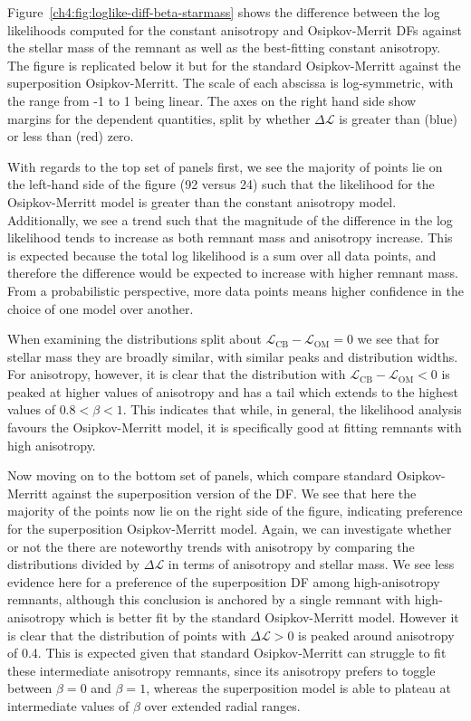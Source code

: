 Figure~\ref{ch4:fig:loglike-diff-beta-starmass} shows the difference between the log likelihoods computed for the constant anisotropy and Osipkov-Merrit DFs against the stellar mass of the remnant as well as the best-fitting constant anisotropy. The figure is replicated below it but for the standard Osipkov-Merritt against the superposition Osipkov-Merritt. The scale of each abscissa is log-symmetric, with the range from -1 to 1 being linear. The axes on the right hand side show margins for the dependent quantities, split by whether $\Delta \mathcal{L}$ is greater than (blue) or less than (red) zero.

With regards to the top set of panels first, we see the majority of points lie on the left-hand side of the figure (92 versus 24) such that the likelihood for the Osipkov-Merritt model is greater than the constant anisotropy model. Additionally, we see a trend such that the magnitude of the difference in the log likelihood tends to increase as both remnant mass and anisotropy increase. This is expected because the total log likelihood is a sum over all data points, and therefore the difference would be expected to increase with higher remnant mass. From a probabilistic perspective, more data points means higher confidence in the choice of one model over another. 

When examining the distributions split about $\mathcal{L}_\mathrm{CB} - \mathcal{L}_\mathrm{OM} = 0$ we see that for stellar mass they are broadly similar, with similar peaks and distribution widths. For anisotropy, however, it is clear that the distribution with $\mathcal{L}_\mathrm{CB} - \mathcal{L}_\mathrm{OM} < 0$ is peaked at higher values of anisotropy and has a tail which extends to the highest values of $0.8 < \beta < 1$. This indicates that while, in general, the likelihood analysis favours the Osipkov-Merritt model, it is specifically good at fitting remnants with high anisotropy.

Now moving on to the bottom set of panels, which compare standard Osipkov-Merritt against the superposition version of the DF. We see that here the majority of the points now lie on the right side of the figure, indicating preference for the superposition Osipkov-Merritt model. Again, we can investigate whether or not the there are noteworthy trends with anisotropy by comparing the distributions divided by $\Delta \mathcal{L}$ in terms of anisotropy and stellar mass. We see less evidence here for a preference of the superposition DF among high-anisotropy remnants, although this conclusion is anchored by a single remnant with high-anisotropy which is better fit by the standard Osipkov-Merritt model. However it is clear that the distribution of points with $\Delta \mathcal{L} > 0$ is peaked around anisotropy of 0.4. This is expected given that standard Osipkov-Merritt can struggle to fit these intermediate anisotropy remnants, since its anisotropy prefers to toggle between $\beta = 0$ and $\beta = 1$, whereas the superposition model is able to plateau at intermediate values of $\beta$ over extended radial ranges.

